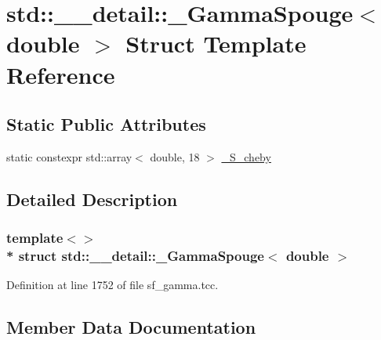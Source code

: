 \hypertarget{structstd_1_1____detail_1_1__GammaSpouge_3_01double_01_4}{}\section{std\+:\+:\+\_\+\+\_\+detail\+:\+:\+\_\+\+Gamma\+Spouge$<$ double $>$ Struct Template Reference}
\label{structstd_1_1____detail_1_1__GammaSpouge_3_01double_01_4}
\subsection*{Static Public Attributes}
\begin{DoxyCompactItemize}
\item 
static constexpr std\+::array$<$ double, 18 $>$ \hyperlink{structstd_1_1____detail_1_1__GammaSpouge_3_01double_01_4_a84c53acfde99ff09d70537e3b4a1c883}{\+\_\+\+S\+\_\+cheby}
\end{DoxyCompactItemize}


\subsection{Detailed Description}
\subsubsection*{template$<$$>$\\*
struct std\+::\+\_\+\+\_\+detail\+::\+\_\+\+Gamma\+Spouge$<$ double $>$}



Definition at line 1752 of file sf\+\_\+gamma.\+tcc.



\subsection{Member Data Documentation}
